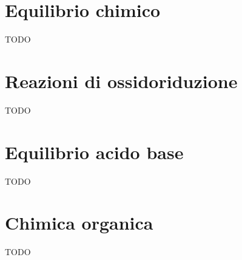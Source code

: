 \documentclass{article}
\begin{document}
\section{Equilibrio chimico}
TODO
\pagebreak

\section{Reazioni di ossidoriduzione}
TODO
\pagebreak

\section{Equilibrio acido base}
TODO
\pagebreak

\section{Chimica organica}
TODO
\end{document}
